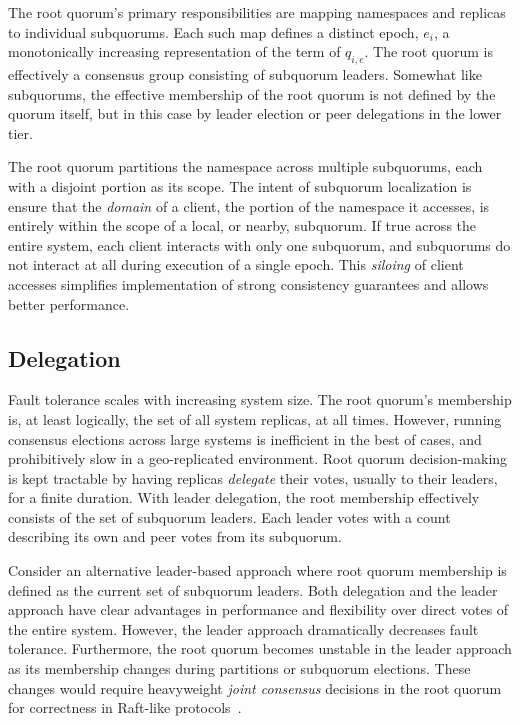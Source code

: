 The root quorum's primary responsibilities are mapping namespaces and replicas to individual subquorums.
Each such map defines a distinct epoch, $e_i$, a monotonically increasing representation of the term of $q_{i,e}$.
The root quorum is effectively a consensus group consisting of subquorum leaders.
Somewhat like subquorums, the effective membership of the root quorum is not defined by the quorum itself, but in this case by leader election or peer delegations in the lower tier.

The root quorum partitions the namespace across multiple subquorums, each with a disjoint portion as its scope.
The intent of subquorum localization is ensure that the \emph{domain} of a client, the portion of the namespace it accesses, is entirely within the scope of a local, or nearby, subquorum.
If true across the entire system, each client interacts with only one subquorum, and subquorums do not interact at all during execution of a single epoch.
This \emph{siloing} of client accesses simplifies implementation of strong consistency guarantees and allows better performance.

\subsection{Delegation}

Fault tolerance scales with increasing system size.
The root quorum's membership is, at least logically, the set of all system replicas, at all times.
However, running consensus elections across large systems is inefficient in the best of cases, and prohibitively slow in a geo-replicated environment.
Root quorum decision-making is kept tractable by having replicas \emph{delegate} their votes, usually to their leaders, for a finite duration.
With leader delegation, the root membership effectively consists of the set of subquorum leaders.
Each leader votes with a count describing its own and peer votes from its
subquorum.

Consider an alternative leader-based approach where root quorum membership is defined as the current set of subquorum leaders.
Both delegation and the leader approach have clear advantages in performance and flexibility over direct votes of the entire system.
However, the leader approach dramatically decreases fault tolerance.
Furthermore, the root quorum becomes unstable in the leader approach as its membership changes during partitions or subquorum elections.
These changes would require heavyweight \emph{joint consensus} decisions in the root quorum for correctness in Raft-like protocols~\cite{raft}.


